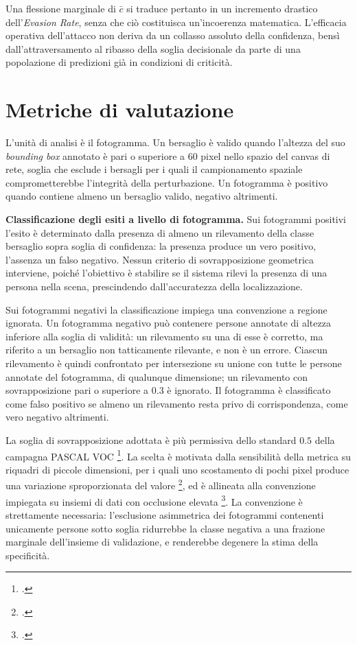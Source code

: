 \documentclass[a4paper,12pt]{report}
\begin{document}
Una flessione marginale di $\bar{c}$ si traduce pertanto in un incremento
drastico dell'\textit{Evasion Rate}, senza che ciò costituisca un'incoerenza
matematica. L'efficacia operativa dell'attacco non deriva da un collasso
assoluto della confidenza, bensì dall'attraversamento al ribasso della soglia
decisionale da parte di una popolazione di predizioni già in condizioni di
criticità.

\section{Metriche di valutazione}
\label{sec:metriche}

L'unità di analisi è il fotogramma. Un bersaglio è valido quando l'altezza del
suo \textit{bounding box} annotato è pari o superiore a $60$ pixel nello spazio
del canvas di rete, soglia che esclude i bersagli per i quali il campionamento
spaziale comprometterebbe l'integrità della perturbazione. Un fotogramma è
positivo quando contiene almeno un bersaglio valido, negativo altrimenti.

\textbf{Classificazione degli esiti a livello di fotogramma.}
\label{sec:esiti}
Sui fotogrammi positivi l'esito è determinato dalla presenza di almeno un
rilevamento della classe bersaglio sopra soglia di confidenza: la presenza
produce un vero positivo, l'assenza un falso negativo. Nessun criterio di
sovrapposizione geometrica interviene, poiché l'obiettivo è stabilire se il
sistema rilevi la presenza di una persona nella scena, prescindendo
dall'accuratezza della localizzazione.

Sui fotogrammi negativi la classificazione impiega una convenzione a regione
ignorata. Un fotogramma negativo può contenere persone annotate di altezza
inferiore alla soglia di validità: un rilevamento su una di esse è corretto, ma
riferito a un bersaglio non tatticamente rilevante, e non è un errore.
Ciascun rilevamento è quindi confrontato per intersezione su unione con tutte le
persone annotate del fotogramma, di qualunque dimensione; un rilevamento con
sovrapposizione pari o superiore a $0.3$ è ignorato. Il fotogramma è classificato
come falso positivo se almeno un rilevamento resta privo di corrispondenza, come
vero negativo altrimenti.

La soglia di sovrapposizione adottata è più permissiva dello standard $0.5$
della campagna PASCAL VOC \footcite{everingham_2010_voc}. La scelta è motivata
dalla sensibilità della metrica su riquadri di piccole dimensioni, per i quali
uno scostamento di pochi pixel produce una variazione sproporzionata del valore
\footcite{yu_2020_scalematch}, ed è allineata alla convenzione impiegata su
insiemi di dati con occlusione elevata \footcite{shao_2018_crowdhuman}. La
convenzione è strettamente necessaria: l'esclusione asimmetrica dei fotogrammi
contenenti unicamente persone sotto soglia ridurrebbe la classe negativa a una
frazione marginale dell'insieme di validazione, e renderebbe degenere la stima
della specificità.
\end{document}
